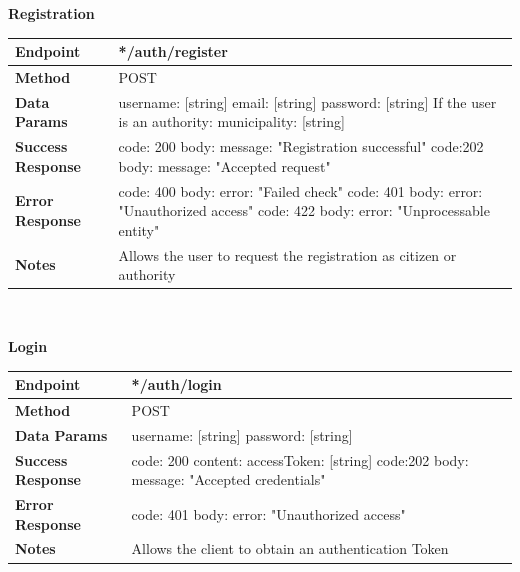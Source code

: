 \documentclass{report}
\begin{document}
\begin{center}{\textbf{Registration}}\end{center}
\begin{tabular}{| l | p{8cm} |}
    \hline
    \textbf{Endpoint} & */auth/register \\
    \hline
    \textbf{Method} & POST \\
    \hline
    \textbf{Data Params} & username: [string] \newline email: [string] \newline password: [string] \newline If the user is an authority: \newline municipality: [string]\\
    \hline
    \textbf{Success Response} & code: 200 \newline body: {message: "Registration successful"} \newline \newline code:202 \newline body: {message: "Accepted request"}\\
    \hline
    \textbf{Error Response} & code: 400 \newline body: {error: "Failed check"} \newline \newline code: 401 \newline body: {error: "Unauthorized access"} \newline \newline code: 422 \newline body: {error: "Unprocessable entity"}   \\
    \hline
    \textbf{Notes} & Allows the user to request the registration as citizen or authority \\
    \hline
\end{tabular}
\\
\begin{center}{\textbf{Login}}\end{center}
\begin{tabular}{| l | p{8cm} |}
	\hline
	\textbf{Endpoint} & */auth/login \\
	\hline
	\textbf{Method} & POST \\
	\hline
	\textbf{Data Params} & username: [string] \newline password: [string]\\
	\hline
	\textbf{Success Response} & code: 200 \newline content: {accessToken: [string]} \newline \newline code:202 \newline body: {message: "Accepted credentials"}\\
	\hline
    \textbf{Error Response} & code: 401 \newline body: {error: "Unauthorized access"} \\
	\hline
	\textbf{Notes} & Allows the client to obtain an authentication Token \\
	\hline
\end{tabular}
\end{document}
